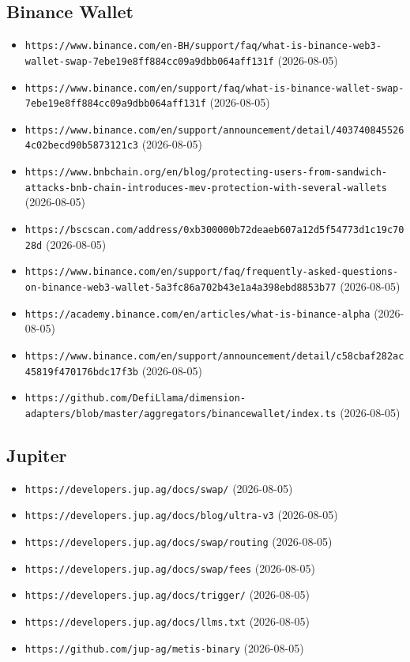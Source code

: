\subsection*{Binance Wallet}
\begin{itemize}\setlength{\itemsep}{0pt}\small
\item \texttt{https://www.binance.com/en-BH/support/faq/what-is-binance-web3-wallet-swap-7ebe19e8ff884cc09a9dbb064aff131f} (2026-08-05)
\item \texttt{https://www.binance.com/en/support/faq/what-is-binance-wallet-swap-7ebe19e8ff884cc09a9dbb064aff131f} (2026-08-05)
\item \texttt{https://www.binance.com/en/support/announcement/detail/4037408455264c02becd90b5873121c3} (2026-08-05)
\item \texttt{https://www.bnbchain.org/en/blog/protecting-users-from-sandwich-attacks-bnb-chain-introduces-mev-protection-with-several-wallets} (2026-08-05)
\item \texttt{https://bscscan.com/address/0xb300000b72deaeb607a12d5f54773d1c19c7028d} (2026-08-05)
\item \texttt{https://www.binance.com/en/support/faq/frequently-asked-questions-on-binance-web3-wallet-5a3fc86a702b43e1a4a398ebd8853b77} (2026-08-05)
\item \texttt{https://academy.binance.com/en/articles/what-is-binance-alpha} (2026-08-05)
\item \texttt{https://www.binance.com/en/support/announcement/detail/c58cbaf282ac45819f470176bdc17f3b} (2026-08-05)
\item \texttt{https://github.com/DefiLlama/dimension-adapters/blob/master/aggregators/binancewallet/index.ts} (2026-08-05)
\end{itemize}

\subsection*{Jupiter}
\begin{itemize}\setlength{\itemsep}{0pt}\small
\item \texttt{https://developers.jup.ag/docs/swap/} (2026-08-05)
\item \texttt{https://developers.jup.ag/docs/blog/ultra-v3} (2026-08-05)
\item \texttt{https://developers.jup.ag/docs/swap/routing} (2026-08-05)
\item \texttt{https://developers.jup.ag/docs/swap/fees} (2026-08-05)
\item \texttt{https://developers.jup.ag/docs/trigger/} (2026-08-05)
\item \texttt{https://developers.jup.ag/docs/llms.txt} (2026-08-05)
\item \texttt{https://github.com/jup-ag/metis-binary} (2026-08-05)
\end{itemize}

